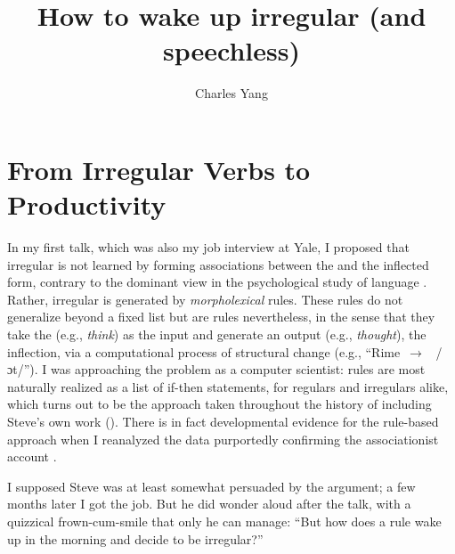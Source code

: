 \documentclass[output=paper,
modfonts
]{LSP/langsci}
\title{How to wake up irregular (and speechless)}
\author{Charles Yang\affiliation{University of Pennsylvania}}
\begin{document}
\maketitle

\section{From Irregular Verbs to  Productivity}
In my first  talk, which was also my job interview at Yale,
I proposed that  irregular  is not learned by forming
associations between the  and the inflected form,  contrary to the
dominant view in the psychological study of language
\citep{Rumelhart1986a, Pinker1999}. Rather, irregular  is
generated by \textit{morpholexical} rules. These rules do not generalize beyond
a fixed list but are rules nevertheless, in the sense that they take
the  (e.g., \textit{think}) as the input and generate an output
(e.g., \textit{thought}), the inflection, via a
computational process of structural change (e.g.,
``Rime~$\rightarrow$~ /ɔt/'').   I was approaching the
problem  as a computer scientist: rules are most 
naturally  realized as a list of if-then statements, 
for regulars and irregulars
alike, which turns out to be the approach taken 
throughout the 
history of  
\citep{Bloch1947, SPE, Halle1993} including Steve's own work
(\citeyear{Anderson1973a, Anderson1992}). There is in fact
developmental evidence for the rule-based approach when I reanalyzed 
the   data purportedly confirming
the associationist account \citep{KLNL}.

I supposed Steve was at least somewhat persuaded by the argument; a
few months later I got the job.  But he did   
wonder aloud after the talk, with a quizzical frown-cum-smile that
only he can manage: ``But how does  a rule wake up in the morning and
decide to be irregular?''  
\end{document}
